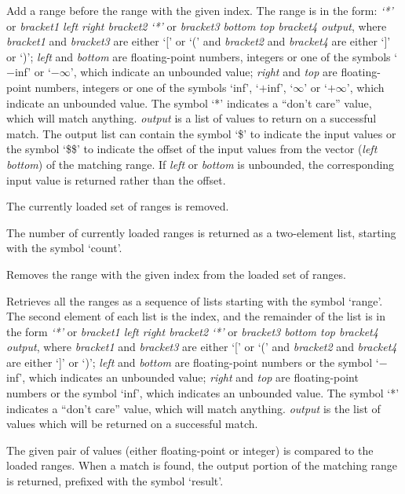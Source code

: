   Add a range before the range with the given index.
  The range is in the form: \emph{`*'} or \emph{bracket1 left right bracket2} \emph{`*'} or \emph{bracket3 bottom top bracket4 output}, where
  \emph{bracket1} and \emph{bracket3} are either `[' or `(' and \emph{bracket2} and \emph{bracket4} are
  either `]' or `)';
  \emph{left} and \emph{bottom} are floating-point numbers, integers or one of the symbols `$-$inf' or
  `$-\infty$', which indicate an unbounded value;
  \emph{right} and \emph{top} are floating-point numbers, integers or one of the symbols `inf', `$+$inf',
  `$\infty$' or `$+\infty$', which indicate an unbounded value.
  The symbol `*' indicates a ``don't care'' value, which will match anything.
  \emph{output} is a list of values to return on a successful match.
  The output list can contain the symbol `\$' to indicate the input values or the symbol `\$\$' to
  indicate the offset of the input values from the vector (\emph{left} \emph{bottom}) of the matching range.
  If \emph{left} or \emph{bottom} is unbounded, the corresponding input value is returned rather than the offset.

  The currently loaded set of ranges is removed.
  
  The number of currently loaded ranges is returned as a two-element list, starting with the symbol
  `count'.
  
  Removes the range with the given index from the loaded set of ranges.

  Retrieves all the ranges as a sequence of lists starting with the symbol `range'.
  The second element of each list is the index, and the remainder of the list is in the form
  \emph{`*'} or \emph{bracket1 left right bracket2} \emph{`*'} or \emph{bracket3 bottom top bracket4 output},
  where \emph{bracket1} and \emph{bracket3} are either `[' or `(' and \emph{bracket2} and \emph{bracket4}
  are either `]' or `)'; \emph{left} and \emph{bottom} are floating-point numbers or the symbol `$-$inf',
  which indicates an unbounded value; \emph{right} and \emph{top} are floating-point numbers or
  the symbol `inf', which indicates an unbounded value.
  The symbol `*' indicates a ``don't care'' value, which will match anything.
  \emph{output} is the list of values which will be returned on a successful match.

  The given pair of values (either floating-point or integer) is compared to the loaded ranges.
  When a match is found, the output portion of the matching range is returned, prefixed with the symbol
  `result'.
  
